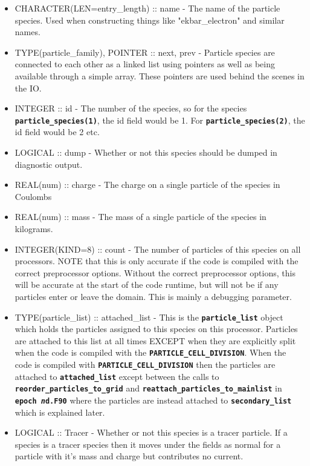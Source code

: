 \documentclass[12pt,a4paper]{article}
\newcommand{\inlinecode}[1]{{\color{warwickred} \bf\texttt{#1}}}
\begin{document}
\begin{itemize}
\item CHARACTER(LEN=entry\_length) :: name - The name of the particle
  species. Used when constructing things like "ekbar\_electron" and similar
  names.
\item TYPE(particle\_family), POINTER :: next, prev - Particle species are
  connected to each other as a linked list using pointers as well as being
  available through a simple array. These pointers are used behind the scenes
  in the IO.
\item INTEGER :: id - The number of the species, so for the species
  \inlinecode{particle\_species(1)}, the id field would be 1. For
  \inlinecode{particle\_species(2)}, the id field would be 2 etc.
\item LOGICAL :: dump - Whether or not this species should be dumped in
  diagnostic output.
\item REAL(num) :: charge - The charge on a single particle of the species in
  Coulombs
\item REAL(num) :: mass - The mass of a single particle of the species in
  kilograms.
\item INTEGER(KIND=8) :: count - The number of particles of this species on
  all processors. NOTE that this is only accurate if the code is compiled with
  the correct preprocessor options. Without the correct preprocessor options,
  this will be accurate at the start of the code runtime, but will not be if
  any particles enter or leave the domain. This is mainly a debugging
  parameter.
\item TYPE(particle\_list) :: attached\_list - This is the
  \inlinecode{particle\_list} object which holds the particles assigned to this
  species on this processor. Particles are attached to this list at all times
  EXCEPT when they are explicitly split when the code is compiled with the
  \inlinecode{PARTICLE\_CELL\_DIVISION}. When the code is compiled with
  \inlinecode{PARTICLE\_CELL\_DIVISION} then the particles are attached to
  \inlinecode{attached\_list} except between the calls to
  \inlinecode{reorder\_particles\_to\_grid} and
  \inlinecode{reattach\_particles\_to\_mainlist} in \inlinecode{epoch{\it
      n}d.F90} where the particles are instead attached to
  \inlinecode{secondary\_list} which is explained later.
\item LOGICAL :: Tracer - Whether or not this species is a tracer particle. If
  a species is a tracer species then it moves under the fields as normal for a
  particle with it's mass and charge but contributes no current.

\end{itemize}
\end{document}
